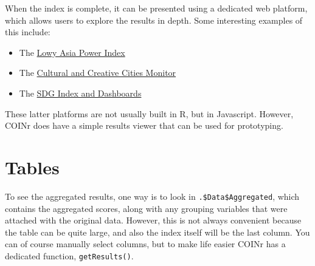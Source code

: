 \documentclass[
]{book}
\newenvironment{Shaded}{\begin{snugshade}}{\end{snugshade}}
\newcommand{\CommentTok}[1]{\textcolor[rgb]{0.56,0.35,0.01}{\textit{#1}}}
\newcommand{\DecValTok}[1]{\textcolor[rgb]{0.00,0.00,0.81}{#1}}
\newcommand{\KeywordTok}[1]{\textcolor[rgb]{0.13,0.29,0.53}{\textbf{#1}}}
\newcommand{\NormalTok}[1]{#1}
\newcommand{\OperatorTok}[1]{\textcolor[rgb]{0.81,0.36,0.00}{\textbf{#1}}}
\newcommand{\StringTok}[1]{\textcolor[rgb]{0.31,0.60,0.02}{#1}}
\providecommand{\tightlist}{%
  \setlength{\itemsep}{0pt}\setlength{\parskip}{0pt}}
\begin{document}
When the index is complete, it can be presented using a dedicated web platform, which allows users to explore the results in depth. Some interesting examples of this include:

\begin{itemize}
\tightlist
\item
  The \href{https://power.lowyinstitute.org/}{Lowy Asia Power Index}
\item
  The \href{https://composite-indicators.jrc.ec.europa.eu/cultural-creative-cities-monitor/performance-map}{Cultural and Creative Cities Monitor}
\item
  The \href{https://dashboards.sdgindex.org/map}{SDG Index and Dashboards}
\end{itemize}

These latter platforms are not usually built in R, but in Javascript. However, COINr does have a simple results viewer that can be used for prototyping.

\hypertarget{tables}{%
\section{Tables}\label{tables}}

To see the aggregated results, one way is to look in \texttt{.\$Data\$Aggregated}, which contains the aggregated scores, along with any grouping variables that were attached with the original data. However, this is not always convenient because the table can be quite large, and also the index itself will be the last column. You can of course manually select columns, but to make life easier COINr has a dedicated function, \texttt{getResults()}.

\begin{Shaded}
\end{Shaded}
\end{document}
